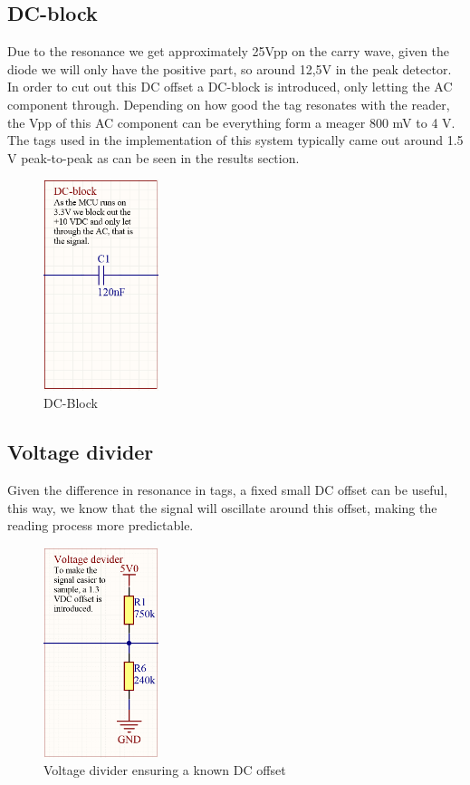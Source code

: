 \subsection{DC-block}
Due to the resonance we get approximately 25Vpp on the carry wave, given the diode we will only have the positive part, so around 12,5V in the peak detector. In order to cut out this DC offset a DC-block is introduced, only letting the AC component through. Depending on how good the tag resonates with the reader, the Vpp of this AC component can be everything form a meager 800 mV to 4 V. The tags used in the implementation of this system typically came out around 1.5 V peak-to-peak as can be seen in the results section. 
\begin{figure}[H]
    \centering
    \includegraphics[width=0.3\textwidth]{05_My_Implementation/figures/DC_block.png}
    \caption{DC-Block}
    \label{fig:my_label}
\end{figure}
\clearpage
\subsection{Voltage divider}
Given the difference in resonance in tags, a fixed small DC offset can be useful, this way, we know that the signal will oscillate around this offset, making the reading process more predictable. 
\begin{figure}[h]
    \centering
    \includegraphics[width=0.3\textwidth]{05_My_Implementation/figures/Voltage_division.png}
    \caption{Voltage divider ensuring a known DC offset}
    \label{fig:my_label}
\end{figure}

